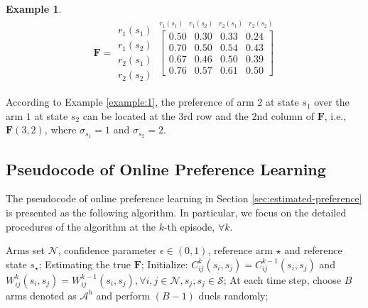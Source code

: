 \documentclass{article} %
\newcommand{\bF}{\mathbf{F}}
\newcommand{\cA}{\mathcal{A}}
\newcommand{\cS}{\mathcal{S}}
\newcommand{\cN}{\mathcal{N}}
\newtheorem{exmp}{Example}
\begin{document}
{\begin{exmp}
\begin{align}\label{eq:example}
\bF=\begin{matrix}
r_1(s_1)\\ r_1(s_2) \\ r_2(s_1) \\r_2(s_2)
\end{matrix}
\overset{\begin{matrix}
r_1(s_1)& \!\!r_1(s_2) &\!\!r_2(s_1) &\!\!r_2(s_2)
\end{matrix}}{\begin{bmatrix}
0.50& 0.30 & 0.33 & 0.24\\
0.70& 0.50 & 0.54 & 0.43\\
0.67& 0.46 & 0.50 & 0.39\\
0.76& 0.57 & 0.61 & 0.50
\end{bmatrix}}
\end{align}
\end{exmp}

According to Example \ref{example:1}, the preference of arm $2$ at state $s_1$ over the arm $1$ at state $s_2$ can be located at the $3$rd row and the $2$nd column of $\bF$, i.e., $\bF(3,2)$, where $\sigma_{s_1}=1$ and $\sigma_{s_2}=2.$  

\subsection{Pseudocode of Online Preference Learning}\label{sec:algorithm_OPL}
The pseudocode of online preference learning in Section \ref{sec:estimated-preference} is presented as the following algorithm. In particular, we focus on the detailed procedures of the algorithm at the $k$-th episode,  $\forall k$.
\begin{algorithm}
\caption{Online Preference Learning for the $k$-th Epsiode}\label{alg:preference}
\begin{algorithmic}[1]
\REQUIRE Arms set  $\mathcal{N}$, confidence parameter $\epsilon \in (0, 1)$, reference arm $\star$ and reference state $s_\star$;
\ENSURE Estimating the true $\bF$;
\STATE Initialize: $C_{ij}^k(s_i, s_j)=C_{ij}^{k-1}(s_i, s_j)$ and $W_{ij}^k(s_i, s_j)=W_{ij}^{k-1}(s_i, s_j), \forall i, j\in\cN, s_j, s_j\in\cS$;
    \STATE At each time step, choose $B$ arms denoted as $\cA^h$ and perform $(B-1)$ duels randomly;
    

\end{algorithmic}
\end{algorithm}}
\end{document}
